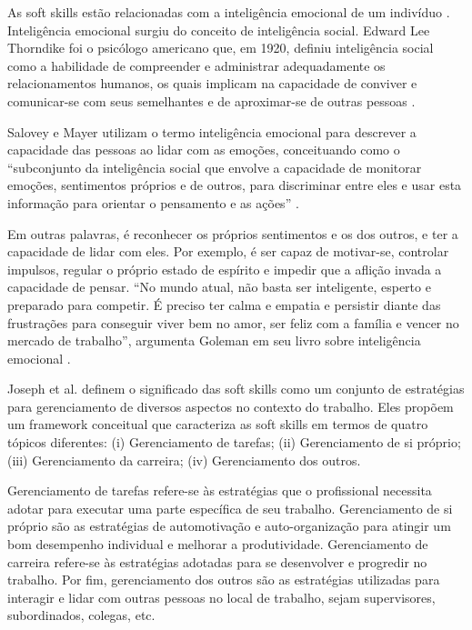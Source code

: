 As soft skills estão relacionadas com a inteligência emocional de um indivíduo \cite{hjyunus:12}. Inteligência emocional surgiu do conceito de inteligência social. Edward Lee Thorndike foi o psicólogo americano que, em 1920, definiu inteligência social como a habilidade de compreender e administrar adequadamente os relacionamentos humanos, os quais implicam na capacidade de conviver e comunicar-se com seus semelhantes e de aproximar-se de outras pessoas \cite{thornlike:20}.

Salovey e Mayer utilizam o termo inteligência emocional para descrever a capacidade das pessoas ao lidar com as emoções, conceituando como o ``subconjunto da inteligência social que envolve a capacidade de monitorar emoções, sentimentos próprios e de outros, para discriminar entre eles e usar esta informação para orientar o pensamento e as ações'' \cite{salovey:90}.

Em outras palavras, é reconhecer os próprios sentimentos e os dos outros, e ter a capacidade de lidar com eles. Por exemplo, é ser capaz de motivar-se, controlar impulsos, regular o próprio estado de espírito e impedir que a aflição invada a capacidade de pensar. ``No mundo atual, não basta ser inteligente, esperto e preparado para competir. É preciso ter calma e empatia e persistir diante das frustrações para conseguir viver bem no amor, ser feliz com a família e vencer no mercado de trabalho'', argumenta Goleman em seu livro sobre inteligência emocional \cite{goleman:07}.

Joseph et al. \cite{joseph:99, joseph:10} definem o significado das soft skills como um conjunto de estratégias para gerenciamento de diversos aspectos no contexto do trabalho. Eles propõem um framework conceitual que caracteriza as soft skills em termos de quatro tópicos diferentes: (i) Gerenciamento de tarefas; (ii) Gerenciamento de si próprio; (iii) Gerenciamento da carreira; (iv) Gerenciamento dos outros.

Gerenciamento de tarefas refere-se às estratégias que o profissional necessita adotar para executar uma parte específica de seu trabalho. Gerenciamento de si próprio são as estratégias de automotivação e auto-organização para atingir um bom desempenho individual e melhorar a produtividade. Gerenciamento de carreira refere-se às estratégias adotadas para se desenvolver e progredir no trabalho. Por fim, gerenciamento dos outros são as estratégias utilizadas para interagir e lidar com outras pessoas no local de trabalho, sejam supervisores, subordinados, colegas, etc.

